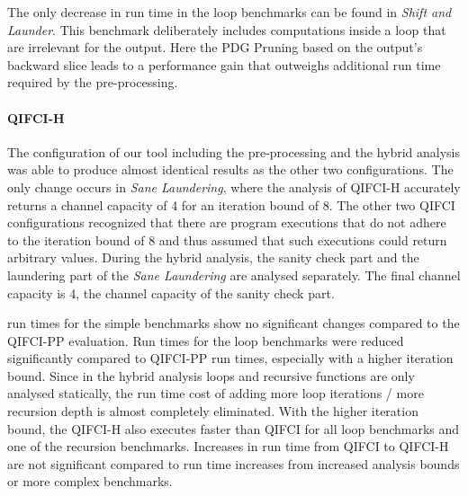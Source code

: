 The only decrease in run time in the loop benchmarks can be found in \emph{Shift and Launder}. This benchmark deliberately includes computations inside a loop that are irrelevant for the output. Here the PDG Pruning based on the output's backward slice leads to a performance gain that outweighs additional run time required by the pre-processing.

\paragraph{QIFCI-H}
The configuration of our tool including the pre-processing and the hybrid analysis was able to produce almost identical results as the other two configurations. The only change occurs in \emph{Sane Laundering}, where the analysis of QIFCI-H accurately returns a channel capacity of 4 for an iteration bound of 8. The other two QIFCI configurations recognized that there are program executions that do not adhere to the iteration bound of 8 and thus assumed that such executions could return arbitrary values. During the hybrid analysis, the sanity check part and the laundering part of the \emph{Sane Laundering} are analysed separately. The final channel capacity is 4, the channel capacity of the sanity check part.

run times for the simple benchmarks show no significant changes compared to the QIFCI-PP evaluation. Run times for the loop benchmarks were reduced significantly compared to QIFCI-PP run times, especially with a higher iteration bound. Since in the hybrid analysis loops and recursive functions are only analysed statically, the run time cost of adding more loop iterations / more recursion depth is almost completely eliminated. With the higher iteration bound, the QIFCI-H also executes faster than QIFCI for all loop benchmarks and one of the recursion benchmarks. Increases in run time from QIFCI to QIFCI-H are not significant compared to run time increases from increased analysis bounds or more complex benchmarks.



